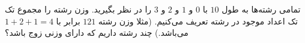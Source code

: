 \EXERCISE
تمامی رشته‌ها به طول 
$10$
با 
$0$
 و 
$1$
  و 
$2$
   و 
$3$
    را در نظر بگیرید. وزن رشته را مجموع تک تک اعداد موجود در رشته تعریف می‌کنیم. (مثلا وزن رشته 
$121$
     برابر با 
$1 + 2 + 1 = 4$
می‌باشد.) چند رشته داریم که دارای وزنی زوج باشد؟